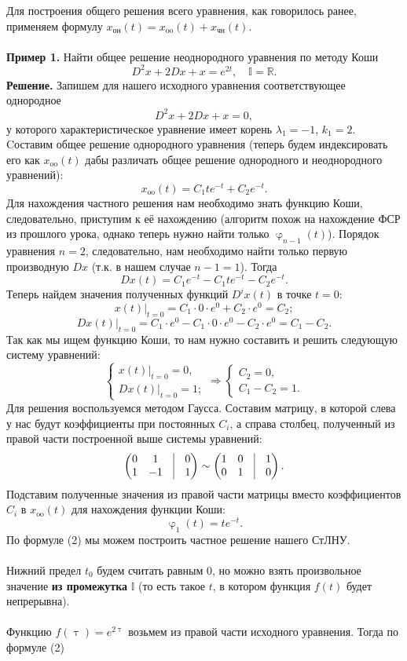 \documentclass[a4paper, 12pt]{article}
\newcommand{\Rm}{\mathbb{R}}
\newcommand{\I}{\mathbb{I}}
\renewcommand{\varphi}{\upvarphi}
\renewcommand{\tau}{\uptau}
\begin{document}
Для построения общего решения всего уравнения, как говорилось ранее, применяем формулу $x_\text{он}(t) = x_\text{oo}(t) + x_\text{чн}(t).$\\\\
\textbf{Пример 1.} Найти общее решение неоднородного уравнения по методу Коши
$$D^2x + 2Dx + x = e^{2t},\quad \I = \Rm.$$
\textbf{Решение.} Запишем для нашего исходного уравнения соответствующее однородное $$D^2x + 2Dx + x = 0,$$ у которого характеристическое уравнение имеет корень $\lambda_1 = -1$, $k_1 = 2$. Cоставим общее решение однородного уравнения (теперь будем индексировать его как $x_\text{oo}(t)$ дабы различать общее решение однородного и неоднородного уравнений): $$x_\text{oo}(t) = C_1te^{-t} + C_2e^{-t}.$$
Для нахождения частного решения нам необходимо знать функцию Коши, следовательно, приступим к её нахождению (алгоритм похож на нахождение ФСР из прошлого урока, однако теперь нужно найти только $\varphi_{n-1}(t)$). Порядок уравнения $n = 2$, следовательно, нам необходимо найти только первую производную $Dx$ (т.к. в нашем случае $n-1 = 1$). Тогда $$Dx(t) = C_1e^{-t} - C_1te^{-t} - C_2e^{-t}.$$
Теперь найдем значения полученных функций $D^ix(t)$ в точке $t = 0$:
$$x(t)|_{t=0} = C_1\cdot 0\cdot e^0 + C_2\cdot e^0 = C_2;$$
$$Dx(t)|_{t=0} = C_1\cdot e^{0} - C_1\cdot 0 \cdot e^{0} - C_2\cdot e^{0} = C_1 - C_2.$$
Так как мы ищем функцию Коши, то нам нужно составить и решить следующую систему уравнений: $$\begin{cases}
	x(t)|_{t=0} = 0,\\
	Dx(t)|_{t=0} = 1;
\end{cases}\Rightarrow\begin{cases}
C_2 = 0,\\
C_1 - C_2 = 1.
\end{cases}$$ Для решения воспользуемся методом Гаусса. Составим матрицу, в которой слева у нас будут коэффициенты при постоянных $C_i$, а справа столбец, полученный из правой части построенной выше системы уравнений:
$$\begin{pmatrix}
	0 & 1 & \vline & 0\\
	1 & -1 & \vline & 1
\end{pmatrix}\sim \begin{pmatrix}
1 & 0 & \vline & 1\\
0 & 1 & \vline & 0
\end{pmatrix}.$$
Подставим полученные значения из правой части матрицы вместо коэффициентов $C_i$ в $x_\text{oo}(t)$ для нахождения функции Коши:
$$\varphi_1(t) = te^{-t}.$$
По формуле (2) мы можем построить частное решение нашего СтЛНУ.\\\\ Нижний предел $t_0$ будем считать равным 0, но можно взять произвольное значение \textbf{из промежутка} $\I$ (то есть такое $t$, в котором функция $f(t)$ будет непрерывна).\\\\ Функцию $f(\uptau) = e^{2\tau}$ возьмем из правой части исходного уравнения. Тогда по формуле (2) 
\end{document}
